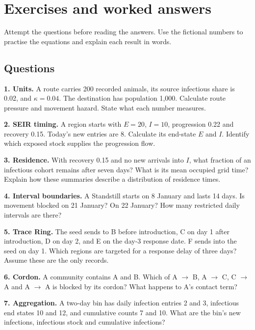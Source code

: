 \documentclass[11pt,a4paper]{article}
\begin{document}
\section{Exercises and worked
answers}\label{exercises-and-worked-answers}

Attempt the questions before reading the answers. Use the fictional
numbers to practise the equations and explain each result in words.

\subsection{Questions}\label{questions}

\textbf{1. Units.} A route carries 200 recorded animals, its source
infectious share is 0.02, and \(\kappa  = 0.04\). The destination has
population 1,000. Calculate route pressure and movement hazard. State
what each number measures.

\textbf{2. SEIR timing.} A region starts with \(E = 20\), \(I = 10\),
progression 0.22 and recovery 0.15. Today's new entries are 8. Calculate
its end-state \(E\) and \(I\). Identify which exposed stock supplies the
progression flow.

\textbf{3. Residence.} With recovery 0.15 and no new arrivals into
\(I\), what fraction of an infectious cohort remains after seven days?
What is its mean occupied grid time? Explain how these summaries
describe a distribution of residence times.

\textbf{4. Interval boundaries.} A Standstill starts on 8 January and
lasts 14 days. Is movement blocked on 21 January? On 22 January? How
many restricted daily intervals are there?

\textbf{5. Trace Ring.} The seed sends to B before introduction, C on
day 1 after introduction, D on day 2, and E on the day-3 response date.
F sends into the seed on day 1. Which regions are targeted for a
response delay of three days? Assume these are the only records.

\textbf{6. Cordon.} A community contains A and B. Which of A \ensuremath{\rightarrow} B, A \ensuremath{\rightarrow} C,
C \ensuremath{\rightarrow} A and A \ensuremath{\rightarrow} A is blocked by its cordon? What happens to A's contact
term?

\textbf{7. Aggregation.} A two-day bin has daily infection entries 2 and
3, infectious end states 10 and 12, and cumulative counts 7 and 10. What
are the bin's new infections, infectious stock and cumulative
infections?
\end{document}
